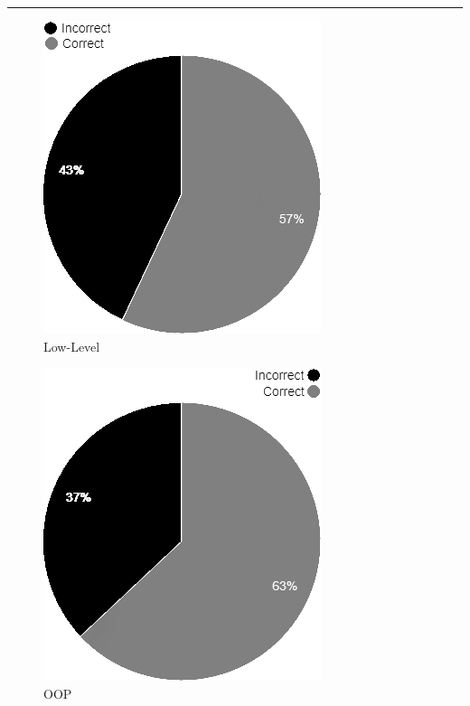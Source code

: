 \vspace{0.4cm}
\hrule    
\hspace{-0.6cm}
\begin{minipage}{0.5\textwidth}
\begin{figure}[H]
    \caption{Low-Level}
    \includegraphics[scale=0.65]{./Images/VSCA low level.png}
\end{figure}
\end{minipage}
\hspace{0.8cm}
\begin{minipage}{0.45\textwidth}\raggedleft
\begin{figure}[H]
    \caption{OOP}
    \includegraphics[scale=0.65]{./Images/VSCA OOP.png}
\end{figure}

\end{minipage}
\hspace{-0.6cm}
